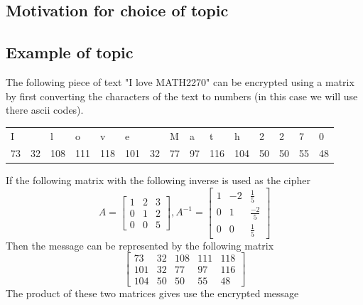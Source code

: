\documentclass{../mathhomework}
\begin{document}
\subsection{Motivation for choice of topic}

\subsection{Example of topic}

The following piece of text "I love MATH2270" can be encrypted using a matrix by first converting the characters
of the text to numbers (in this case we will use there ascii codes).
\begin{table}[H]
    \begin{tabular}{lllllllllllllll}
    I  &    & l   & o   & v   & e   &    & M  & a  & t   & h   & 2  & 2  & 7  & 0  \\
    73 & 32 & 108 & 111 & 118 & 101 & 32 & 77 & 97 & 116 & 104 & 50 & 50 & 55 & 48
    \end{tabular}
\end{table}
\noindent If the following matrix with the following inverse is used as the cipher
\begin{equation*}
    A = \begin{bmatrix}
        1 & 2 & 3 \\
        0 & 1 & 2 \\
        0 & 0 & 5
    \end{bmatrix},
    A^{-1} = \begin{bmatrix}
        1 & -2 & \frac{1}{5} \\ 
        0 & 1 & \frac{-2}{5} \\
        0 & 0 & \frac{1}{5}
    \end{bmatrix}
\end{equation*}
Then the message can be represented by the following matrix
\begin{equation*}
    \begin{bmatrix}
        73 & 32 & 108 & 111 & 118 \\ 
        101 & 32 & 77 & 97 & 116 \\ 
        104 & 50 & 50 & 55 & 48
    \end{bmatrix}
\end{equation*}
The product of these two matrices gives use the encrypted message
\end{document}
